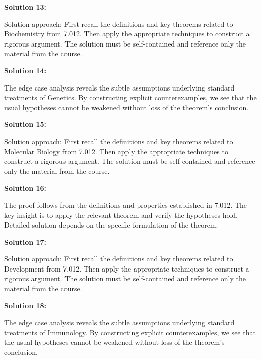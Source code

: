 \documentclass[12pt,a4paper]{exam}
\begin{document}
\vspace{0.5cm}

\textbf{Solution 13:}

Solution approach: First recall the definitions and key theorems related to Biochemistry from 7.012. Then apply the appropriate techniques to construct a rigorous argument. The solution must be self-contained and reference only the material from the course.

\vspace{0.5cm}

\textbf{Solution 14:}

The edge case analysis reveals the subtle assumptions underlying standard treatments of Genetics. By constructing explicit counterexamples, we see that the usual hypotheses cannot be weakened without loss of the theorem's conclusion.

\vspace{0.5cm}

\textbf{Solution 15:}

Solution approach: First recall the definitions and key theorems related to Molecular Biology from 7.012. Then apply the appropriate techniques to construct a rigorous argument. The solution must be self-contained and reference only the material from the course.

\vspace{0.5cm}

\textbf{Solution 16:}

The proof follows from the definitions and properties established in 7.012. The key insight is to apply the relevant theorem and verify the hypotheses hold. Detailed solution depends on the specific formulation of the theorem.

\vspace{0.5cm}

\textbf{Solution 17:}

Solution approach: First recall the definitions and key theorems related to Development from 7.012. Then apply the appropriate techniques to construct a rigorous argument. The solution must be self-contained and reference only the material from the course.

\vspace{0.5cm}

\textbf{Solution 18:}

The edge case analysis reveals the subtle assumptions underlying standard treatments of Immunology. By constructing explicit counterexamples, we see that the usual hypotheses cannot be weakened without loss of the theorem's conclusion.
\end{document}
